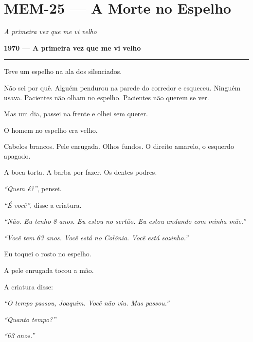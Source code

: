 \section*{\textbf{MEM-25} --- A Morte no Espelho}

\noindent \textit{A primeira vez que me vi velho}

\noindent \textbf{1970 --- A primeira vez que me vi velho}

\vspace{0.5em}\noindent\rule{\textwidth}{0.5pt}\vspace{0.5em}

\noindent Teve um espelho na ala dos silenciados.

\noindent Não sei por quê. Alguém pendurou na parede do corredor e esqueceu. Ninguém usava. Pacientes não olham no espelho. Pacientes não querem se ver.

\noindent Mas um dia, passei na frente e olhei sem querer.

\noindent O homem no espelho era velho.

\noindent Cabelos brancos. Pele enrugada. Olhos fundos. O direito amarelo, o esquerdo apagado.

\noindent A boca torta. A barba por fazer. Os dentes podres.

\noindent \textit{\textquotedblleft{}Quem é?\textquotedblright{}}, pensei.

\noindent \textit{\textquotedblleft{}É você\textquotedblright{}}, disse a criatura.

\noindent \textit{\textquotedblleft{}Não. Eu tenho 8 anos. Eu estou no sertão. Eu estou andando com minha mãe.\textquotedblright{}}

\noindent \textit{\textquotedblleft{}Você tem 63 anos. Você está no Colônia. Você está sozinho.\textquotedblright{}}

\noindent Eu toquei o rosto no espelho.

\noindent A pele enrugada tocou a mão.

\noindent A criatura disse:

\noindent \textit{\textquotedblleft{}O tempo passou, Joaquim. Você não viu. Mas passou.\textquotedblright{}}

\noindent \textit{\textquotedblleft{}Quanto tempo?\textquotedblright{}}

\noindent \textit{\textquotedblleft{}63 anos.\textquotedblright{}}

